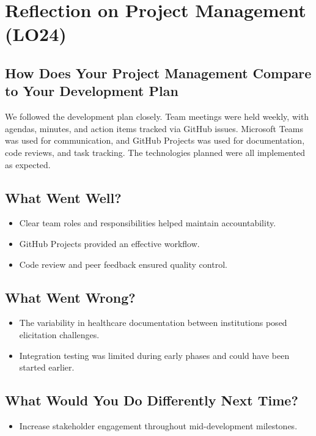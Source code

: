 \documentclass{article}
\begin{document}
 \section{Reflection on Project Management (LO24)}
 
 \subsection{How Does Your Project Management Compare to Your Development Plan}
 
 We followed the development plan closely. Team meetings were held weekly, with agendas, minutes, and action items tracked via GitHub issues. Microsoft Teams was used for communication, and GitHub Projects was used for documentation, code reviews, and task tracking. The technologies planned were all implemented as expected.
 
 \subsection{What Went Well?}
 
 \begin{itemize}
     \item Clear team roles and responsibilities helped maintain accountability.
     \item GitHub Projects provided an effective workflow.
     \item Code review and peer feedback ensured quality control.
 \end{itemize}
 
 \subsection{What Went Wrong?}
 
 \begin{itemize}
     \item The variability in healthcare documentation between institutions posed elicitation challenges.
     \item Integration testing was limited during early phases and could have been started earlier.
 \end{itemize}
 
 \subsection{What Would You Do Differently Next Time?}
 
 \begin{itemize}
     \item Increase stakeholder engagement throughout mid-development milestones.
 \end{itemize}
 
\end{document}
